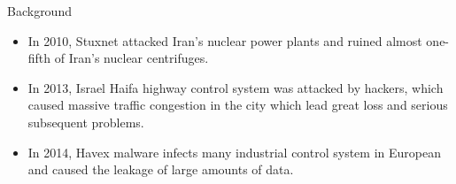 \begin{frame}{Background}\label{Introduction: ICSs are under Attacks}
    \begin{itemize}
      \item In 2010, Stuxnet attacked Iran's nuclear power plants and ruined almost one-fifth of Iran's nuclear centrifuges.
      \item In 2013, Israel Haifa highway control system  was attacked by hackers, which caused massive traffic congestion in the city which lead great loss and serious subsequent problems.
      \item In 2014, Havex malware infects many industrial control system in European  and caused the leakage of large amounts of data.
    \end{itemize}

    \begin{minipage}[c][][t]{0.6\textwidth}
      
    \end{minipage}
    \begin{minipage}[c][][t]{0.35\textwidth}
    \end{minipage}
\end{frame}

